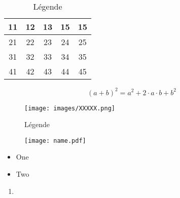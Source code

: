 \begin{table}[H]
\centering
    \begin{tabular}{|c|c|c|c|c|}
    \hline
    11 & 12 & 13 & 15 & 15  \\
    \hline
    21 & 22 & 23 & 24 & 25  \\
    \hline
    31 & 32 & 33 & 34 & 35  \\
    \hline
    41 & 42 & 43 & 44 & 45  \\      
    \hline
    \end{tabular}
    \caption{Légende}
    \label{table:Name}
\end{table}

\begin{equation}
    \label{eq:Name}
    (a+b)^2 = a^2 + 2 \cdot a \cdot b + b^2 
\end{equation}

\begin{figure}[H]
    \centering
    \texttt{[image: images/XXXXX.png]}
    \caption{Légende}
    \label{fig:Name}
\end{figure}

\begin{figure}[H]
    \centering
    \texttt{[image: name.pdf]}
\end{figure}

\begin{itemize}
  \item One
  \item Two
\end{itemize}

\begin{enumerate}
    \item
\end{enumerate}

\iffalse 
    Texte à mettre en commentaire
\fi